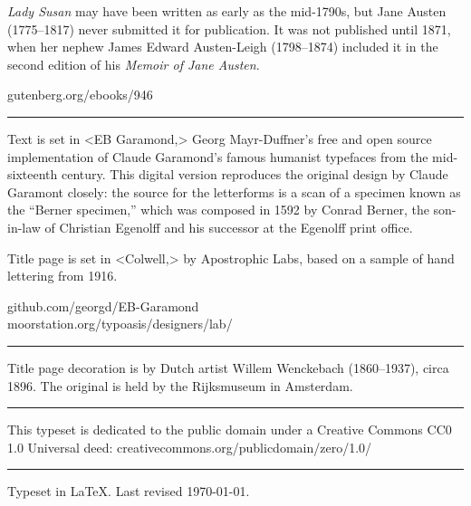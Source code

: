 \documentclass[
paper=5.5in:8.5in,
]{scrbook}
\begin{document}
\vfill
\begin{minipage}{\textwidth}
\textit{Lady Susan} may have been written as early as the mid-1790s, but Jane Austen (1775--1817) never submitted it for publication. It was not published until 1871, when her nephew James Edward Austen-Leigh (1798--1874) included it in the second edition of his \textit{Memoir of Jane Austen}.
\end{minipage}
\vfill
gutenberg.org/ebooks/946
\vfill
\rule{0.5\textwidth}{.4pt}
\vfill
\begin{minipage}{\textwidth}
Text is set in <EB Garamond,> Georg Mayr-Duffner's free and open source implementation of Claude Garamond’s famous humanist typefaces from the mid-sixteenth century. This digital version reproduces the original design by Claude Garamont closely: the source for the letterforms is a scan of a specimen known as the \enquote{Berner specimen,} which was composed in 1592 by Conrad Berner, the son-in-law of Christian Egenolff and his successor at the Egenolff print office.

Title page is set in <Colwell,> by Apostrophic Labs, based on a sample of hand lettering from 1916.
\end{minipage}
\vfill
github.com/georgd/EB-Garamond\\moorstation.org/typoasis/designers/lab/
\vfill
\rule{0.5\textwidth}{.4pt}
\vfill
\begin{minipage}{\textwidth}
Title page decoration is by Dutch artist Willem Wenckebach (1860--1937), circa 1896. The original is held by the Rijksmuseum in Amsterdam.
\end{minipage}
\vfill
\rule{0.5\textwidth}{.4pt}
\vfill
\begin{minipage}{\textwidth}
This typeset is dedicated to the public domain under a Creative Commons CC0 1.0 Universal deed: creativecommons.org/publicdomain/zero/1.0/\\
\end{minipage}
\vfill
\rule{0.5\textwidth}{.4pt}
\vfill
Typeset in \LaTeX{}. Last revised \today.
\vfill
\thispagestyle{empty}
\end{document}
